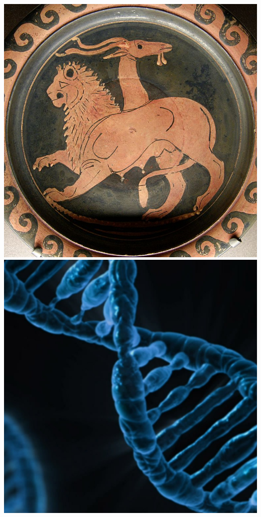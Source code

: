 \documentclass{ximera}
\begin{document}
\begin{image}
  \includegraphics{chimera.jpg}\quad
  \includegraphics{dna.jpg}
\end{image}
\end{document}

